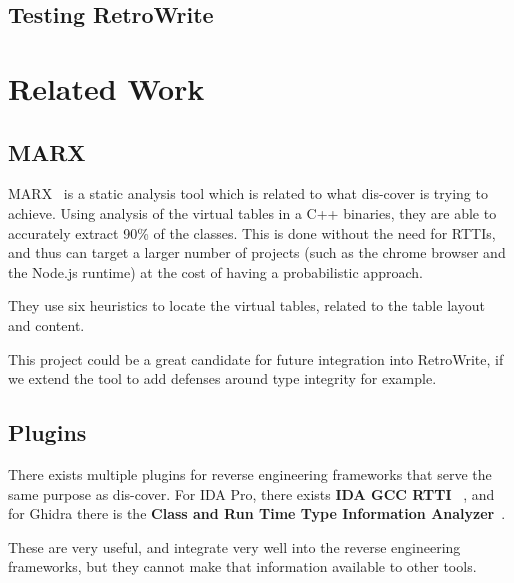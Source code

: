 \documentclass[a4paper,11pt,oneside]{report}
\begin{document}
\section{Testing RetroWrite}


\chapter{Related Work}



\section{MARX}

MARX~\cite{marx} is a static analysis tool which is related to what dis-cover
is trying to achieve. Using analysis of the virtual tables in a C++ binaries,
they are able to accurately extract 90\% of the classes. This is done without
the need for RTTIs, and thus can target a larger number of projects (such as
the chrome browser and the Node.js runtime) at the cost of having a
probabilistic approach.

They use six heuristics to locate the virtual tables, related to the table
layout and content.

This project could be a great candidate for future integration into
RetroWrite, if we extend the tool to add defenses around type integrity for
example.

\section{Plugins}

There exists multiple plugins for reverse engineering frameworks that serve
the same purpose as dis-cover. For IDA Pro, there exists \textbf{IDA GCC RTTI}
~\cite{idagccrtti}, and for Ghidra there is the \textbf{Class and Run Time
Type Information Analyzer}~\cite{ghidracppclassanalyzer}.

These are very useful, and integrate very well into the reverse engineering
frameworks, but they cannot make that information available to other tools.
\end{document}
